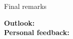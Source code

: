 \begin{frame}{Final remarks}

    \textbf{Outlook:}\\


    \textbf{Personal feedback:}\\
  

\end{frame}